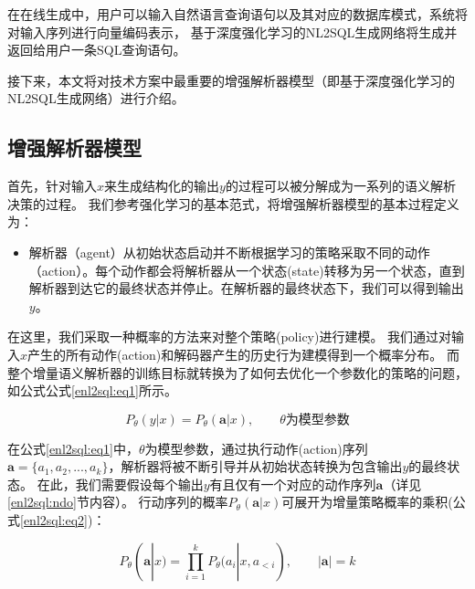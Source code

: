 在在线生成中，用户可以输入自然语言查询语句以及其对应的数据库模式，系统将对输入序列进行向量编码表示，
基于深度强化学习的NL2SQL生成网络将生成并返回给用户一条SQL查询语句。

接下来，本文将对技术方案中最重要的增强解析器模型（即基于深度强化学习的NL2SQL生成网络）进行介绍。

\subsection{增强解析器模型}
\label{enl2sql:zqjxqmx}
首先，针对输入$x$来生成结构化的输出$y$的过程可以被分解成为一系列的语义解析决策的过程。
我们参考强化学习的基本范式，将增强解析器模型的基本过程定义为：

\begin{itemize}
  \item 解析器（agent）从初始状态启动并不断根据学习的策略采取不同的动作（action）。每个动作都会将解析器从一个状态(state)转移为另一个状态，直到解析器到达它的最终状态并停止。在解析器的最终状态下，我们可以得到输出$y$。
\end{itemize}

在这里，我们采取一种概率的方法来对整个策略(policy)进行建模。
我们通过对输入$x$产生的所有动作(action)和解码器产生的历史行为建模得到一个概率分布。
而整个增量语义解析器的训练目标就转换为了如何去优化一个参数化的策略的问题，如公式公式\ref{enl2sql:eq1}所示。

\begin{equation}
    \label{enl2sql:eq1}
    P_{\theta}(y|x) = P_{\theta}(\boldsymbol{a}|x),  \qquad \theta\text{为模型参数}
\end{equation}

在公式\ref{enl2sql:eq1}中，$\theta$为模型参数，通过执行动作(action)序列$\boldsymbol{a} = \{a_{1},a_{2},...,a_{k}\}$，解析器将被不断引导并从初始状态转换为包含输出$y$的最终状态。
在此，我们需要假设每个输出$y$有且仅有一个对应的动作序列$\boldsymbol{a}$（详见\ref{enl2sql:ndo}节内容）。
行动序列的概率$P_{\theta}(\boldsymbol{a}|x)$可展开为增量策略概率的乘积(公式\ref{enl2sql:eq2})：

\begin{equation}
    \label{enl2sql:eq2}
    P_{\theta}(\boldsymbol{a}|x) = \prod^k_{i=1}P_{\theta}(a_{i}|x,a_{<i}),   \qquad |\boldsymbol{a}| = k
\end{equation}

